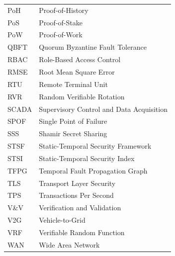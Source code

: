 \documentclass[12pt, oneside, a4paper]{report}
\theoremstyle{definition}
\theoremstyle{remark}
\begin{document}
\begin{longtable}{ll}
PoH & Proof-of-History \\
PoS & Proof-of-Stake \\
PoW & Proof-of-Work \\
QBFT & Quorum Byzantine Fault Tolerance \\
RBAC & Role-Based Access Control \\
RMSE & Root Mean Square Error \\
RTU & Remote Terminal Unit \\
RVR & Random Verifiable Rotation \\
SCADA & Supervisory Control and Data Acquisition \\
SPOF & Single Point of Failure \\
SSS & Shamir Secret Sharing \\
STSF & Static-Temporal Security Framework \\
STSI & Static-Temporal Security Index \\
TFPG & Temporal Fault Propagation Graph \\
TLS & Transport Layer Security \\
TPS & Transactions Per Second \\
V\&V & Verification and Validation \\
V2G & Vehicle-to-Grid \\
VRF & Verifiable Random Function \\
WAN & Wide Area Network \\
\bottomrule
\end{longtable}


\cleardoublepage



﻿%



\cleardoublepage


﻿%



\cleardoublepage


\end{document}
